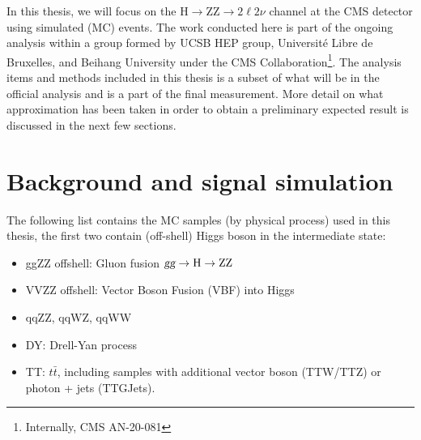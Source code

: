 In this thesis, we will focus on the $\mathrm{H} \rightarrow \mathrm{ZZ} \rightarrow 2\ell2\nu$ channel
at the CMS detector using simulated (MC) events. The work conducted here is part of the ongoing analysis
within a group formed by UCSB HEP group, Universit\'e Libre de Bruxelles, and Beihang University under
the CMS Collaboration\footnote{Internally, CMS AN-20-081}. The analysis items and methods included in this
thesis is a subset of what will be in the official analysis and is a part of the final measurement. More
detail on what approximation has been taken in order to obtain a preliminary expected result is discussed
in the next few sections.



\section{Background and signal simulation}




The following list contains the MC samples (by physical process) used in this thesis, the first two
contain (off-shell) Higgs boson in the intermediate state:
\begin{itemize}
\item ggZZ offshell: Gluon fusion $\textsl{g}\textsl{g} \rightarrow\mathrm{H}\rightarrow\mathrm{ZZ}$
\item VVZZ offshell: Vector Boson Fusion (VBF) into Higgs
\item qqZZ, qqWZ, qqWW
\item DY: Drell-Yan process
\item TT: $t\bar{t}$, including samples with additional vector boson (TTW/TTZ) or photon + jets (TTGJets).
\end{itemize}

